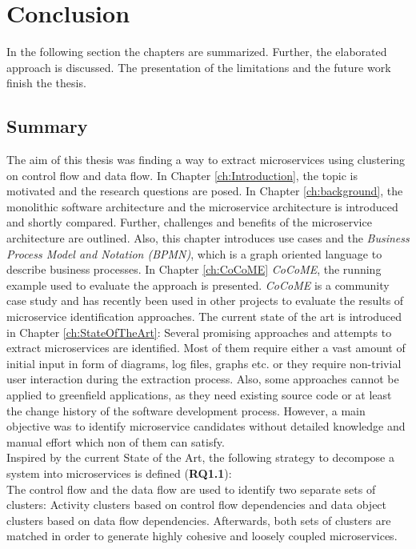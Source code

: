 \chapter{Conclusion}
\label{ch:Conclusion}
In the following section the chapters are summarized. Further, the elaborated approach is discussed. The presentation of the limitations and the future work finish the thesis.


\section{Summary}
The aim of this thesis was finding a way to extract microservices using clustering on control flow and data flow. In Chapter \ref{ch:Introduction}, the topic is motivated and the research questions are posed. In Chapter \ref{ch:background}, the monolithic software architecture and the microservice architecture is introduced and shortly compared. Further, challenges and benefits of the microservice architecture are outlined. Also, this chapter introduces use cases and the \textit{Business Process Model and Notation (BPMN)}, which is a graph oriented language to describe business processes. In Chapter \ref{ch:CoCoME} \textit{CoCoME}, the running example used to evaluate the approach is presented. \textit{CoCoME} is a community case study and has recently been used in other projects to evaluate the results of microservice identification approaches. The current state of the art is introduced in Chapter \ref{ch:StateOfTheArt}: Several promising approaches and attempts to extract microservices are identified. Most of them require either a vast amount of initial input in form of diagrams, log files, graphs etc. or they require non-trivial user interaction during the extraction process. Also, some approaches cannot be applied to greenfield applications, as they need existing source code or at least the change history of the software development process. However, a main objective was to identify microservice candidates without detailed knowledge and manual effort which non of them can satisfy. \\

\noindent
Inspired by the current State of the Art, the following strategy to decompose a system into microservices is defined (\textbf{RQ1.1}): \\
The control flow and the data flow are used to identify two separate sets of clusters: Activity clusters based on control flow dependencies and data object clusters based on data flow dependencies. Afterwards, both sets of clusters are matched in order to generate highly cohesive and loosely coupled microservices. \\

